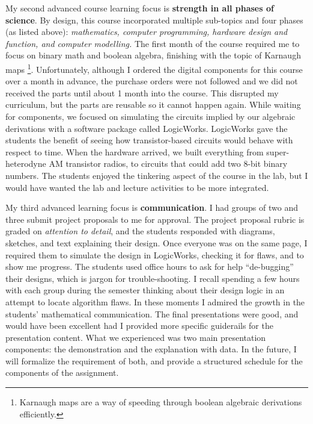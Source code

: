 \documentclass[../../../main.tex]{subfiles}
\begin{document}
My second advanced course learning focus is \textbf{strength in all phases of science}.  By design, this course incorporated multiple sub-topics and four phases (as listed above): \textit{mathematics, computer programming, hardware design and function, and computer modelling.}  The first month of the course required me to focus on binary math and boolean algebra, finishing with the topic of Karnaugh maps \footnote{Karnaugh maps are a way of speeding through boolean algebraic derivations efficiently.}.  Unfortunately, although I ordered the digital components for this course over a month in advance, the purchase orders were not followed and we did not received the parts until about 1 month into the course.  This disrupted my curriculum, but the parts are reusable so it cannot happen again.  While waiting for components, we focused on simulating the circuits implied by our algebraic derivations with a software package called LogicWorks.  LogicWorks gave the students the benefit of seeing how transistor-based circuits would behave with respect to time.  When the hardware arrived, we built everything from super-heterodyne AM transistor radios, to circuits that could add two 8-bit binary numbers.  The students enjoyed the tinkering aspect of the course in the lab, but I would have wanted the lab and lecture activities to be more integrated. \\ \hspace{0.1cm}

My third advanced learning focus is \textbf{communication}.  I had groups of two and three submit project proposals to me for approval.  The project proposal rubric is graded on \textit{attention to detail}, and the students responded with diagrams, sketches, and text explaining their design.  Once everyone was on the same page, I required them to simulate the design in LogicWorks, checking it for flaws, and to show me progress.  The students used office hours to ask for help ``de-bugging'' their designs, which is jargon for trouble-shooting.  I recall spending a few hours with each group during the semester thinking about their design logic in an attempt to locate algorithm flaws.  In these moments I admired the growth in the students' mathematical communication.  The final presentations were good, and would have been excellent had I provided more specific guiderails for the presentation content.  What we experienced was two main presentation components: the demonstration and the explanation with data.  In the future, I will formalize the requirement of both, and provide a structured schedule for the components of the assignment. \\ \hspace{0.1cm}
\end{document}
